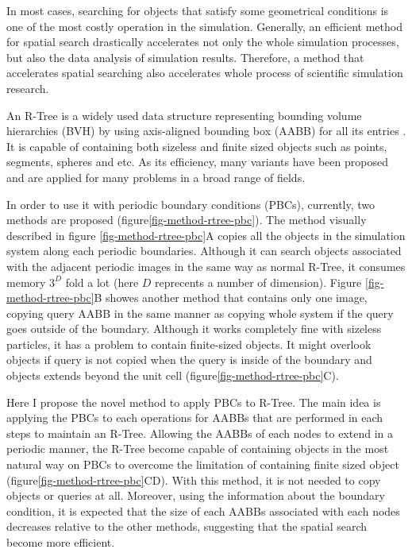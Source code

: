 \documentclass[10pt,letterpaper,twocolumn]{article}
\begin{document}
In most cases, searching for objects that satisfy some geometrical conditions
is one of the most costly operation in the simulation. Generally, an efficient
method for spatial search drastically accelerates not only the whole simulation
processes, but also the data analysis of simulation results. Therefore, a method
that accelerates spatial searching also accelerates whole process of scientific
simulation research.

An R-Tree is a widely used data structure representing bounding volume
hierarchies (BVH) by using axis-aligned bounding box (AABB) for all its entries
\cite{Guttman1984}. It is capable of containing both sizeless and finite sized
objects such as points, segments, spheres and etc. As its efficiency, many
variants have been proposed and are applied for many problems in a broad range
of fields.

In order to use it with periodic boundary conditions (PBCs), currently,
two methods are proposed (figure\ref{fig-method-rtree-pbc})\cite{CoSTR-R-tree2016}.
The method visually described in figure \ref{fig-method-rtree-pbc}A copies all the objects in
the simulation system along each periodic boundaries.
Although it can search objects associated with the adjacent periodic images in
the same way as normal R-Tree, it consumes memory $3^D$ fold a lot (here $D$
reprecents a number of dimension).
Figure \ref{fig-method-rtree-pbc}B showes another method that contains only one image,
copying query AABB in the same manner as copying whole system if the query goes
outside of the boundary.
Although it works completely fine with sizeless particles, it has a problem to
contain finite-sized objects. It might overlook objects if query is not copied
when the query is inside of the boundary and objects extends beyond the unit
cell (figure\ref{fig-method-rtree-pbc}C).

Here I propose the novel method to apply PBCs to R-Tree. The main idea is
applying the PBCs to each operations for AABBs that are performed in each steps
to maintain an R-Tree. Allowing the AABBs of each nodes to extend in a periodic
manner, the R-Tree become capable of containing objects in the most natural way
on PBCs to overcome the limitation of containing finite sized object
(figure\ref{fig-method-rtree-pbc}CD). With this method, it is not needed to copy objects
or queries at all. Moreover, using the information about the boundary condition,
it is expected that the size of each AABBs associated with each nodes decreases
relative to the other methods, suggesting that the spatial search become more
efficient.
\end{document}
